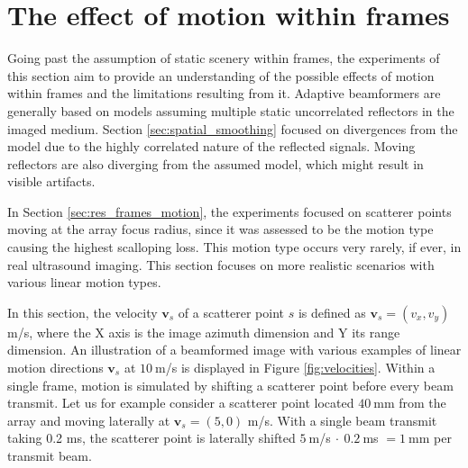 \section{The effect of motion within frames}
\label{sec:res_beams_motion}
Going past the assumption of static scenery within frames, the experiments of this section aim to provide an understanding of the possible effects of motion within frames and the limitations resulting from it.
Adaptive beamformers are generally based on models assuming multiple static uncorrelated reflectors in the imaged medium. Section \ref{sec:spatial_smoothing} focused on divergences from the model due to the highly correlated nature of the reflected signals. Moving reflectors are also diverging from the assumed model, which might result in visible artifacts.

In Section \ref{sec:res_frames_motion}, the experiments focused on scatterer points moving at the array focus radius, since it was assessed to be the motion type causing the highest scalloping loss.
This motion type occurs very rarely, if ever, in real ultrasound imaging. This section focuses on more realistic scenarios with various linear motion types.

In this section, the velocity $\boldsymbol{v}_s$ of a scatterer point $s$ is defined as  $\boldsymbol{v}_s = (v_x, v_y)~$m/s, where the X axis is the image azimuth dimension and Y its range dimension. An illustration of a beamformed image with various examples of linear motion directions $\boldsymbol{v}_s$ at $10~$m/s is displayed in Figure \ref{fig:velocities}.
Within a single frame, motion is simulated by shifting a scatterer point before every beam transmit. Let us for example consider a scatterer point located $40~$mm from the array and moving laterally at $\boldsymbol{v}_s = (5, 0)$ m/s. With a single beam transmit taking 0.2 ms, the scatterer point is laterally shifted $5~$m/s$~\cdot~0.2~$ms $= 1~$mm per transmit beam.

